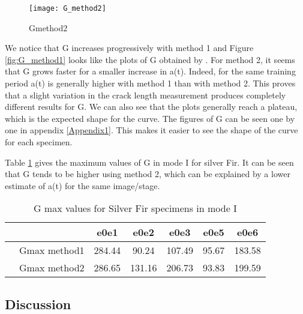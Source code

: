 \begin{figure}[htp]
	\centering
	\texttt{[image: G\_method2]}
	\caption{Gmethod2}
	\label{fig:G_method2}
\end{figure}

We notice that G increases progressively with method 1 and Figure \ref{fig:G_method1} looks like the plots of G obtained by \cite{Odounga2018phd}. For method 2, it seems that G grows faster for a smaller increase in a(t). Indeed, for the same training period a(t) is generally higher with method 1 than with method 2. This proves that a slight variation in the crack length measurement produces completely different results for G. We can also see that the plots generally reach a plateau, which is the expected shape for the curve.
The figures of G can be seen one by one in appendix \ref{Appendix1}. This makes it easier to see the shape of the curve for each specimen.

Table \ref{fig:tableG1} gives the maximum values of G in mode I for silver Fir. It can be seen that G tends to be higher using method 2, which can be explained by a lower estimate of a(t) for the same image/stage.

\begin{table} [H]
	\centering
	\begin{tabular}{ccccccc}
		\toprule %
		&  & e0e1 & e0e2 & e0e3 & e0e5 & e0e6\\\midrule
		& Gmax method1 & 284.44 & 90.24 & 107.49 & 95.67 & 183.58 \\\midrule
		& Gmax method2 & 286.65 & 131.16 & 206.73 & 93.83 & 199.59 \\\midrule
	\end{tabular}
	\caption{G max values for Silver Fir specimens in mode I}
	\label{fig:tableG1}
\end{table}

\subsection{Discussion}

